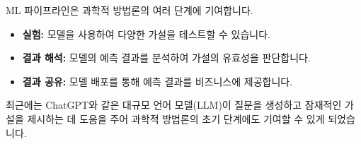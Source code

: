 \documentclass[11pt,a4paper]{article}
\theoremstyle{definition}
\begin{document}
\begin{tcolorbox}[examplebox={과학적 방법론과 ML 파이프라인의 결합}]
ML 파이프라인은 과학적 방법론의 여러 단계에 기여합니다.
\begin{itemize}
    \item \textbf{실험:} 모델을 사용하여 다양한 가설을 테스트할 수 있습니다.
    \item \textbf{결과 해석:} 모델의 예측 결과를 분석하여 가설의 유효성을 판단합니다.
    \item \textbf{결과 공유:} 모델 배포를 통해 예측 결과를 비즈니스에 제공합니다.
\end{itemize}
최근에는 ChatGPT와 같은 대규모 언어 모델(LLM)이 질문을 생성하고 잠재적인 가설을 제시하는 데 도움을 주어 과학적 방법론의 초기 단계에도 기여할 수 있게 되었습니다.
\end{tcolorbox}
\end{document}
